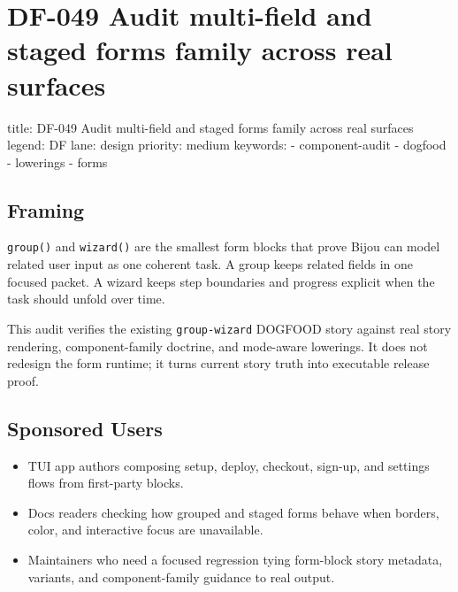 \chapter{DF-049 Audit multi-field and staged forms family across real surfaces}\label{record-097}

\smallskip

\begin{RecordMeta}
title: DF-049 Audit multi-field and staged forms family across real surfaces
legend: DF
lane: design
priority: medium
keywords:
  - component-audit
  - dogfood
  - lowerings
  - forms

\end{RecordMeta}

\section{Framing}\label{record-097-framing}

\texttt{g\allowbreak{}r\allowbreak{}o\allowbreak{}u\allowbreak{}p\allowbreak{}(\allowbreak{})} and \texttt{w\allowbreak{}i\allowbreak{}z\allowbreak{}a\allowbreak{}r\allowbreak{}d\allowbreak{}(\allowbreak{})} are the smallest form blocks that prove Bijou can model related user input as one coherent task. A group keeps related fields in one focused packet. A wizard keeps step boundaries and progress explicit when the task should unfold over time.

This audit verifies the existing \texttt{g\allowbreak{}r\allowbreak{}o\allowbreak{}u\allowbreak{}p\allowbreak{}-\allowbreak{}w\allowbreak{}i\allowbreak{}z\allowbreak{}a\allowbreak{}r\allowbreak{}d} DOGFOOD story against real story rendering, component-family doctrine, and mode-aware lowerings. It does not redesign the form runtime; it turns current story truth into executable release proof.

\section{Sponsored Users}\label{record-097-sponsored-users}

\begin{itemize}
\tightlist
\item
  TUI app authors composing setup, deploy, checkout, sign-up, and settings flows from first-party blocks.
\item
  Docs readers checking how grouped and staged forms behave when borders, color, and interactive focus are unavailable.
\item
  Maintainers who need a focused regression tying form-block story metadata, variants, and component-family guidance to real output.
\end{itemize}

